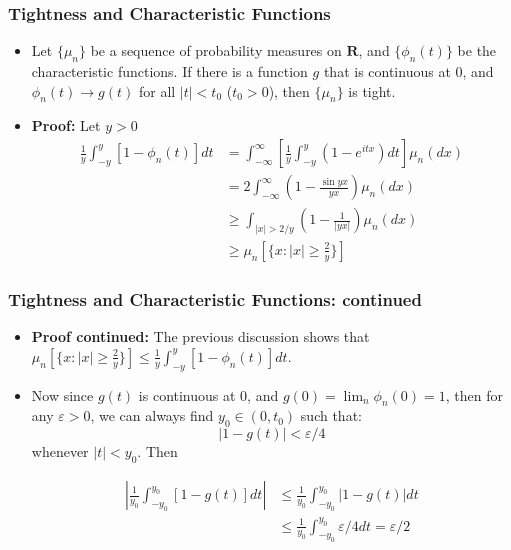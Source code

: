 \documentclass[handout]{beamer}
\begin{document}

\frame
{
  \frametitle{Tightness and Characteristic Functions}

 \begin{itemize}
 
 \item<1->[] \begin{Lemma}[11.1.13]
 Let $\{\mu_n\}$ be a sequence of probability measures on $\mathbf{R}$, and $\{\phi_n(t)\}$ be the characteristic functions. If there is a function $g$ that is continuous at 0, and $\phi_n(t)\rightarrow g(t)$ for all $|t|<t_0$ ($t_0>0$), then $\{\mu_n\}$ is tight. 
 \end{Lemma}
 
 \item<2-> \textbf{Proof:} 
 Let $y > 0$
\begin{align*} 
\frac{1}{y} \int_{-y}^{y} [1-\phi_n(t)] dt
& = \int_{-\infty}^{\infty} \left[ \frac{1}{y} \int_{-y}^{y} (1-e^{itx}) dt \right]\mu_n (dx)  \\
&= 2 \int_{-\infty}^{\infty} (1-\frac{\sin y x}{y x}) \mu_n (dx)  \\
&\geq \int_{|x|>2/y} (1-\frac{1}{|y x|}) \mu_n (dx)  \\ 
& \geq \mu_n[\{x: |x| \geq \frac{2}{y}\}]  
\end{align*} 


\end{itemize}
 }



\frame
{
  \frametitle{Tightness and Characteristic Functions: continued}

 \begin{itemize}
 
 \item<1-> \textbf{Proof continued:} The previous discussion shows that $\mu_n[\{x: |x| \geq \frac{2}{y}\}] \leq \frac{1}{y} \int_{-y}^{y} [1-\phi_n(t)] dt$. 
 
\item<2->[-] Now since $g(t)$ is continuous at 0, and $g(0)=\lim_n \phi_n(0)=1$, then for any $\varepsilon>0$, we can always find $y_0 \in (0,t_0)$ such that:
$$
|1 - g(t)| < \varepsilon / 4
$$
whenever $|t| < y_0$. Then

\begin{align*}
\left| \frac{1}{y_0} \int_{-y_0}^{y_0} [1-g(t)] dt \right| &\le  \frac{1}{y_0} \int_{-y_0}^{y_0} \left|1-g(t)\right| dt \\
&\le  \frac{1}{y_0} \int_{-y_0}^{y_0} \varepsilon/4 dt = \varepsilon/2 \\
\end{align*}
\end{itemize}
 }
 
\end{document}
